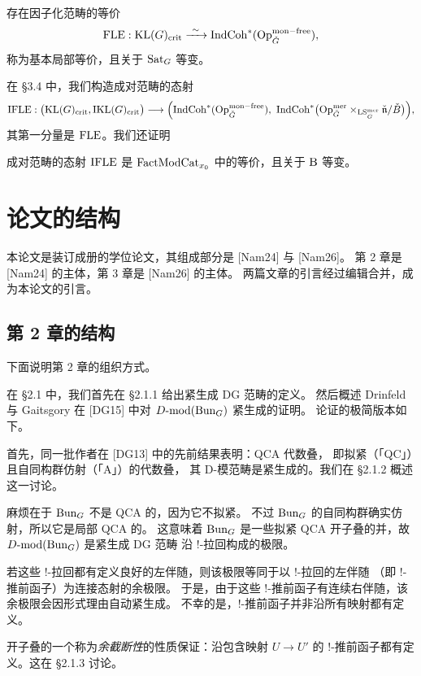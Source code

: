 \begin{proposition}[\textup{[ABC+24a]}]
\label{prop:1.1.2.5}
存在因子化范畴的等价
\[
\FLE:\KL(G)_{\mathrm{crit}}\xrightarrow{\ \sim\ }\IndCoh^{*}(\Op^{\monfree}_{\Gd}),
\]
称为基本局部等价，且关于 $\mathrm{Sat}_G$ 等变。
\end{proposition}

在 §3.4 中，我们构造成对范畴的态射
\[
\mathrm{IFLE}:\bigl(\mathrm{KL}(G)_{\mathrm{crit}},\mathrm{IKL}(G)_{\mathrm{crit}}\bigr)\longrightarrow
\Bigl(\mathrm{IndCoh}^{*}(\mathrm{Op}^{\mathrm{mon-free}}_{\check{G}}),\
\mathrm{IndCoh}^{*}\bigl(\mathrm{Op}^{\mathrm{mer}}_{\check{G}}\times_{\mathrm{LS}^{\mathrm{mer}}_{\check{G}}}\check{\mathfrak{n}}/\check{B}\bigr)\Bigr),
\]
其第一分量是 $\mathrm{FLE}$。我们还证明

\begin{theorem}
\label{thm:1.1.2.6}
成对范畴的态射 $\mathrm{IFLE}$ 是 $\mathrm{FactModCat}_{x_0}$ 中的等价，且关于 $\mathrm{B}$ 等变。
\end{theorem}

\section{论文的结构}
\label{sec:1.2}

本论文是装订成册的学位论文，其组成部分是 [Nam24] 与 [Nam26]。
第 2 章是 [Nam24] 的主体，第 3 章是 [Nam26] 的主体。
两篇文章的引言经过编辑合并，成为本论文的引言。

\subsection{第 2 章的结构}
\label{sec:1.2.1}

下面说明第 2 章的组织方式。

在 §2.1 中，我们首先在 §2.1.1 给出紧生成 DG 范畴的定义。
然后概述 Drinfeld 与 Gaitsgory 在 [DG15] 中对 $D\text{-}\mathrm{mod}(\mathrm{Bun}_G)$ 紧生成的证明。
论证的极简版本如下。

首先，同一批作者在 [DG13] 中的先前结果表明：QCA 代数叠，
即拟紧（「QC」）且自同构群仿射（「A」）的代数叠，
其 D-模范畴是紧生成的。我们在 §2.1.2 概述这一讨论。

麻烦在于 $\mathrm{Bun}_G$ 不是 QCA 的，因为它不拟紧。
不过 $\mathrm{Bun}_G$ 的自同构群确实仿射，所以它是局部 QCA 的。
这意味着 $\mathrm{Bun}_G$ 是一些拟紧 QCA 开子叠的并，故 $D\text{-}\mathrm{mod}(\mathrm{Bun}_G)$ 是紧生成 DG 范畴
沿 $!$-拉回构成的极限。

若这些 $!$-拉回都有定义良好的左伴随，则该极限等同于以 $!$-拉回的左伴随
（即 $!$-推前函子）为连接态射的余极限。
于是，由于这些 $!$-推前函子有连续右伴随，该余极限会因形式理由自动紧生成。
不幸的是，$!$-推前函子并非沿所有映射都有定义。

开子叠的一个称为\emph{余截断性}的性质保证：沿包含映射 $U\to U'$ 的
$!$-推前函子都有定义。这在 §2.1.3 讨论。

